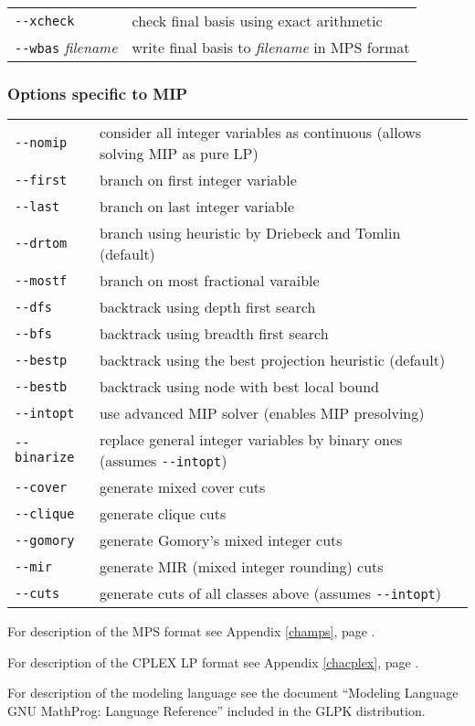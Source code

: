 \noindent
\begin{tabular}{@{}p{30mm}p{92.3mm}@{}}
\verb|--xcheck|   & check final basis using exact arithmetic \\
\verb|--wbas| {\it filename}
                  & write final basis to {\it filename} in MPS format \\
\end{tabular}

\subsubsection*{Options specific to MIP}

\noindent
\begin{tabular}{@{}p{30mm}p{92.3mm}@{}}
\verb|--nomip|    &  consider all integer variables as continuous
                     (allows solving MIP as pure LP) \\
\verb|--first|    &  branch on first integer variable \\
\verb|--last|     &  branch on last integer variable \\
\verb|--drtom|    &  branch using heuristic by Driebeck and Tomlin
                     (default) \\
\verb|--mostf|    &  branch on most fractional varaible \\
\verb|--dfs|      &  backtrack using depth first search \\
\verb|--bfs|      &  backtrack using breadth first search \\
\verb|--bestp|    &  backtrack using the best projection heuristic
                     (default) \\
\verb|--bestb|    &  backtrack using node with best local bound \\
\verb|--intopt|   &  use advanced MIP solver (enables MIP presolving)\\
\verb|--binarize| &  replace general integer variables by binary ones
                     (assumes \verb|--intopt|)\\
\verb|--cover|    &  generate mixed cover cuts\\
\verb|--clique|   &  generate clique cuts\\
\verb|--gomory|   &  generate Gomory's mixed integer cuts\\
\verb|--mir|      &  generate MIR (mixed integer rounding) cuts\\
\verb|--cuts|     &  generate cuts of all classes above (assumes
                     \verb|--intopt|)\\
\end{tabular}

\bigskip

\noindent
For description of the MPS format see Appendix \ref{champs},
page \pageref{champs}.

\bigskip

\noindent
For description of the CPLEX LP format see Appendix \ref{chacplex},
page \pageref{chacplex}.

\bigskip

\noindent
For description of the modeling language see the document ``Modeling
Language GNU MathProg: Language Reference'' included in the GLPK
distribution.

